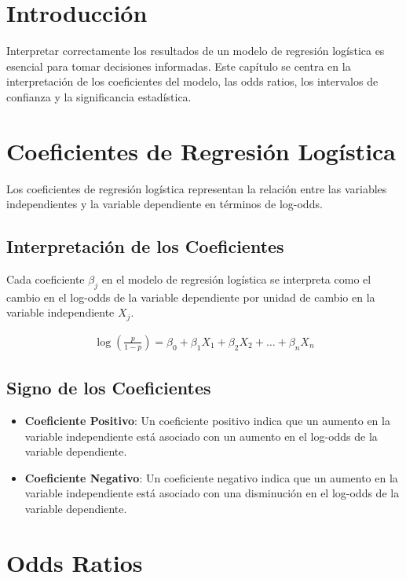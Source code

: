 
\section{Introducci\'on}

Interpretar correctamente los resultados de un modelo de regresi\'on log\'istica es esencial para tomar decisiones informadas. Este cap\'itulo se centra en la interpretaci\'on de los coeficientes del modelo, las odds ratios, los intervalos de confianza y la significancia estad\'istica.

\section{Coeficientes de Regresi\'on Log\'istica}

Los coeficientes de regresi\'on log\'istica representan la relaci\'on entre las variables independientes y la variable dependiente en t\'erminos de log-odds. 

\subsection{Interpretaci\'on de los Coeficientes}

Cada coeficiente $\beta_j$ en el modelo de regresi\'on log\'istica se interpreta como el cambio en el log-odds de la variable dependiente por unidad de cambio en la variable independiente $X_j$.

\begin{eqnarray*}
\log\left(\frac{p}{1-p}\right) = \beta_0 + \beta_1 X_1 + \beta_2 X_2 + \ldots + \beta_n X_n
\end{eqnarray*}

\subsection{Signo de los Coeficientes}

\begin{itemize}
    \item \textbf{Coeficiente Positivo}: Un coeficiente positivo indica que un aumento en la variable independiente est\'a asociado con un aumento en el log-odds de la variable dependiente.
    \item \textbf{Coeficiente Negativo}: Un coeficiente negativo indica que un aumento en la variable independiente est\'a asociado con una disminuci\'on en el log-odds de la variable dependiente.
\end{itemize}

\section{Odds Ratios}

